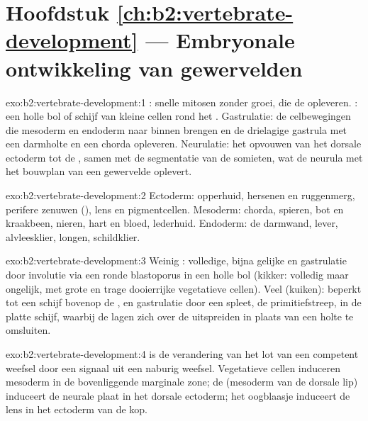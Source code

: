 \section*{Hoofdstuk \ref{ch:b2:vertebrate-development} --- Embryonale ontwikkeling van gewervelden}

\begin{solution}{exo:b2:vertebrate-development:1}
: snelle mitosen zonder groei, die de  opleveren.
: een holle bol of schijf van kleine cellen rond het
. Gastrulatie: de celbewegingen die mesoderm en endoderm naar
binnen brengen en de drielagige gastrula met een darmholte en een chorda
opleveren. Neurulatie: het opvouwen van het dorsale ectoderm tot de
, samen met de segmentatie van de somieten, wat de neurula met
het bouwplan van een gewervelde oplevert.
\end{solution}

\begin{solution}{exo:b2:vertebrate-development:2}
Ectoderm: opperhuid, hersenen en ruggenmerg, perifere zenuwen (), lens en pigmentcellen. Mesoderm: chorda, spieren, bot en
kraakbeen, nieren, hart en bloed, lederhuid. Endoderm: de darmwand, lever,
alvleesklier, longen, schildklier.
\end{solution}

\begin{solution}{exo:b2:vertebrate-development:3}
Weinig : volledige, bijna gelijke  en gastrulatie door
involutie via een ronde blastoporus in een holle bol (kikker: volledig
maar ongelijk, met grote en trage dooierrijke vegetatieve cellen). Veel
 (kuiken):  beperkt tot een schijf bovenop de , en
gastrulatie door een spleet, de primitiefstreep, in de platte schijf,
waarbij de lagen zich over de  uitspreiden in plaats van een holte
te omsluiten.
\end{solution}

\begin{solution}{exo:b2:vertebrate-development:4}
 is de verandering van het lot van een competent weefsel door een
signaal uit een naburig weefsel. Vegetatieve cellen induceren mesoderm in
de bovenliggende marginale zone; de  (mesoderm van de dorsale
lip) induceert de neurale plaat in het dorsale ectoderm; het oogblaasje
induceert de lens in het ectoderm van de kop.
\end{solution}

